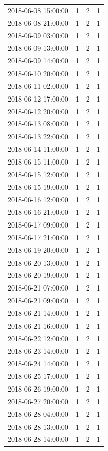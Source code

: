 \begin{tabular}{lrrr}
2018-06-08 15:00:00 & 1 & 2 & 1 \\
2018-06-08 21:00:00 & 1 & 2 & 1 \\
2018-06-09 03:00:00 & 1 & 2 & 1 \\
2018-06-09 13:00:00 & 1 & 2 & 1 \\
2018-06-09 14:00:00 & 1 & 2 & 1 \\
2018-06-10 20:00:00 & 1 & 2 & 1 \\
2018-06-11 02:00:00 & 1 & 2 & 1 \\
2018-06-12 17:00:00 & 1 & 2 & 1 \\
2018-06-12 20:00:00 & 1 & 2 & 1 \\
2018-06-13 08:00:00 & 1 & 2 & 1 \\
2018-06-13 22:00:00 & 1 & 2 & 1 \\
2018-06-14 11:00:00 & 1 & 2 & 1 \\
2018-06-15 11:00:00 & 1 & 2 & 1 \\
2018-06-15 12:00:00 & 1 & 2 & 1 \\
2018-06-15 19:00:00 & 1 & 2 & 1 \\
2018-06-16 12:00:00 & 1 & 2 & 1 \\
2018-06-16 21:00:00 & 1 & 2 & 1 \\
2018-06-17 09:00:00 & 1 & 2 & 1 \\
2018-06-17 21:00:00 & 1 & 2 & 1 \\
2018-06-19 20:00:00 & 1 & 2 & 1 \\
2018-06-20 13:00:00 & 1 & 2 & 1 \\
2018-06-20 19:00:00 & 1 & 2 & 1 \\
2018-06-21 07:00:00 & 1 & 2 & 1 \\
2018-06-21 09:00:00 & 1 & 2 & 1 \\
2018-06-21 14:00:00 & 1 & 2 & 1 \\
2018-06-21 16:00:00 & 1 & 2 & 1 \\
2018-06-22 12:00:00 & 1 & 2 & 1 \\
2018-06-23 14:00:00 & 1 & 2 & 1 \\
2018-06-24 14:00:00 & 1 & 2 & 1 \\
2018-06-25 17:00:00 & 1 & 2 & 1 \\
2018-06-26 19:00:00 & 1 & 2 & 1 \\
2018-06-27 20:00:00 & 1 & 2 & 1 \\
2018-06-28 04:00:00 & 1 & 2 & 1 \\
2018-06-28 13:00:00 & 1 & 2 & 1 \\
2018-06-28 14:00:00 & 1 & 2 & 1 \\

\end{tabular}

